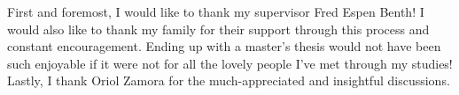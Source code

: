 \begin{acknowledgements}
\markboth{}{} %
First and foremost, I would like to thank my supervisor Fred Espen Benth! I would also like to thank my family for their support through this process and constant encouragement. Ending up with a master's thesis would not have been such enjoyable if it were not for all the lovely people I've met through my studies! Lastly, I thank Oriol Zamora for the much-appreciated and insightful discussions. 
\end{acknowledgements}